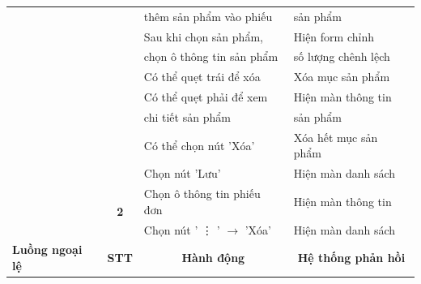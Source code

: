 \documentclass[../DoAn.tex]{subfiles}
\begin{document}
\begin{table}[H]
\begin{tabular}{|l|c|l|l|}
                                                 &                                                               & thêm sản phẩm vào phiếu                   & sản phẩm                                        \\ \cline{3-4}
                                                 &                                                               & Sau khi chọn sản phẩm,                    & Hiện form chỉnh                                 \\
                                                 &                                                               & chọn ô thông tin sản phẩm                 & số lượng chênh lệch                             \\ \cline{3-4}
                                                 &                                                               & Có thể quẹt trái để xóa                   & Xóa mục sản phẩm                                \\ \cline{3-4}
                                                 &                                                               & Có thể quẹt phải để xem                   & Hiện màn thông tin                              \\
                                                 &                                                               & chi tiết sản phẩm                         & sản phẩm                                        \\ \cline{3-4}
                                                 &                                                               & Có thể chọn nút 'Xóa'                     & Xóa hết mục sản phẩm                            \\ \cline{3-4}
                                                 &                                                               & Chọn nút 'Lưu'                            & Hiện màn danh sách                              \\ \cline{2-4}
                                                 & \multirow{2}{*}{\textbf{2}}                                   & Chọn ô thông tin phiếu đơn                & Hiện màn thông tin                              \\ \cline{3-4}
                                                 &                                                               & Chọn nút ' \vdots{} ' $\rightarrow$ 'Xóa' & Hiện màn danh sách                              \\ \hline
        \multirow{5}{*}{\textbf{Luồng ngoại lệ}} & \multicolumn{1}{c|}{\textbf{STT}}                             & \multicolumn{1}{c|}{\textbf{Hành động}}   & \multicolumn{1}{c|}{\textbf{Hệ thống phản hồi}} \\ \cline{2-4}

\end{tabular}
\end{table}
\end{document}
